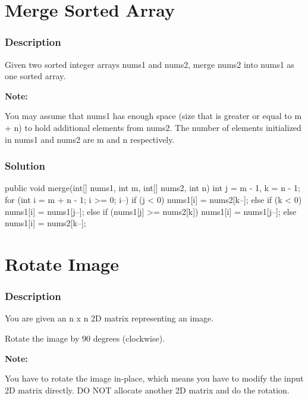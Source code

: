 \newpage

\section{Merge Sorted Array} %

\subsubsection{Description}
Given two sorted integer arrays nums1 and nums2, merge nums2 into nums1 as one sorted array.

\textbf{Note:}

You may assume that nums1 has enough space (size that is greater or equal to m + n) to hold additional elements from nums2. The number of elements initialized in nums1 and nums2 are m and n respectively.

\subsubsection{Solution}

\begin{Code}
public void merge(int[] nums1, int m, int[] nums2, int n) {
    int j = m - 1, k = n - 1;
    for (int i = m + n - 1; i >= 0; i--) {
        if (j < 0) {
            nums1[i] = nums2[k--];
        } else if (k < 0) {
            nums1[i] = nums1[j--];
        } else {
            if (nums1[j] >= nums2[k]) {
                nums1[i] = nums1[j--];
            } else {
                nums1[i] = nums2[k--];
            }
        }
    }
}
\end{Code}

\newpage

\section{Rotate Image} %

\subsubsection{Description}
You are given an n x n 2D matrix representing an image.

Rotate the image by 90 degrees (clockwise).

\textbf{Note:}

You have to rotate the image in-place, which means you have to modify the input 2D matrix directly. DO NOT allocate another 2D matrix and do the rotation.


